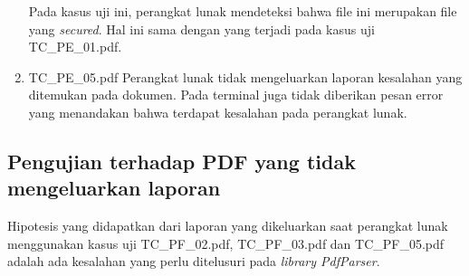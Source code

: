 \begin{enumerate}
	Pada kasus uji ini, perangkat lunak mendeteksi bahwa file ini merupakan file yang \textit{secured}. Hal ini sama dengan yang terjadi pada kasus uji TC\_PE\_01.pdf.
	
	\item TC\_PE\_05.pdf \newline
	Perangkat lunak tidak mengeluarkan laporan kesalahan yang ditemukan pada dokumen. Pada terminal juga tidak diberikan pesan error yang menandakan bahwa terdapat kesalahan pada perangkat lunak.
	
\end{enumerate}

\subsection{Pengujian terhadap PDF yang tidak mengeluarkan laporan}
Hipotesis yang didapatkan dari laporan yang dikeluarkan saat perangkat lunak menggunakan kasus uji TC\_PF\_02.pdf, TC\_PF\_03.pdf dan TC\_PF\_05.pdf adalah ada kesalahan yang perlu ditelusuri pada \textit{library PdfParser}.


